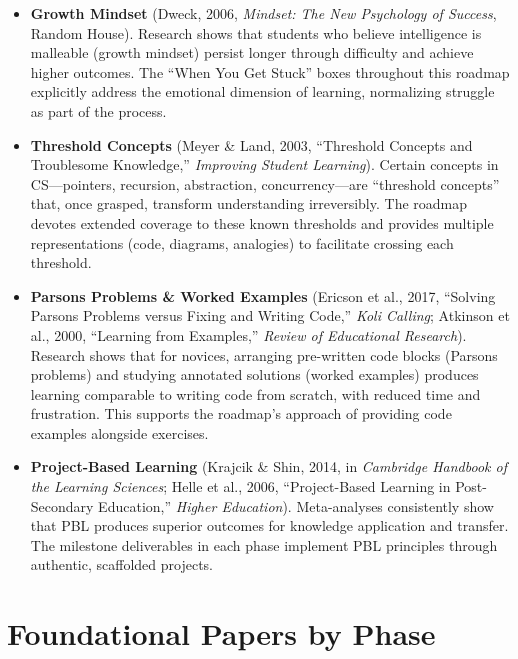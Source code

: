 \documentclass[11pt, a4paper, oneside]{report}
\begin{document}
{{{{{{{{{{{{\begin{itemize}[leftmargin=*]
\item \textbf{Growth Mindset} (Dweck, 2006, \emph{Mindset: The New Psychology of Success}, Random House). Research shows that students who believe intelligence is malleable (growth mindset) persist longer through difficulty and achieve higher outcomes. The ``When You Get Stuck'' boxes throughout this roadmap explicitly address the emotional dimension of learning, normalizing struggle as part of the process.

\item \textbf{Threshold Concepts} (Meyer \& Land, 2003, ``Threshold Concepts and Troublesome Knowledge,'' \emph{Improving Student Learning}). Certain concepts in CS---pointers, recursion, abstraction, concurrency---are ``threshold concepts'' that, once grasped, transform understanding irreversibly. The roadmap devotes extended coverage to these known thresholds and provides multiple representations (code, diagrams, analogies) to facilitate crossing each threshold.

\item \textbf{Parsons Problems \& Worked Examples} (Ericson et al., 2017, ``Solving Parsons Problems versus Fixing and Writing Code,'' \emph{Koli Calling}; Atkinson et al., 2000, ``Learning from Examples,'' \emph{Review of Educational Research}). Research shows that for novices, arranging pre-written code blocks (Parsons problems) and studying annotated solutions (worked examples) produces learning comparable to writing code from scratch, with reduced time and frustration. This supports the roadmap's approach of providing code examples alongside exercises.

\item \textbf{Project-Based Learning} (Krajcik \& Shin, 2014, in \emph{Cambridge Handbook of the Learning Sciences}; Helle et al., 2006, ``Project-Based Learning in Post-Secondary Education,'' \emph{Higher Education}). Meta-analyses consistently show that PBL produces superior outcomes for knowledge application and transfer. The milestone deliverables in each phase implement PBL principles through authentic, scaffolded projects.
\end{itemize}

\section*{Foundational Papers by Phase}

}}}}}}}}}}}}
\end{document}
